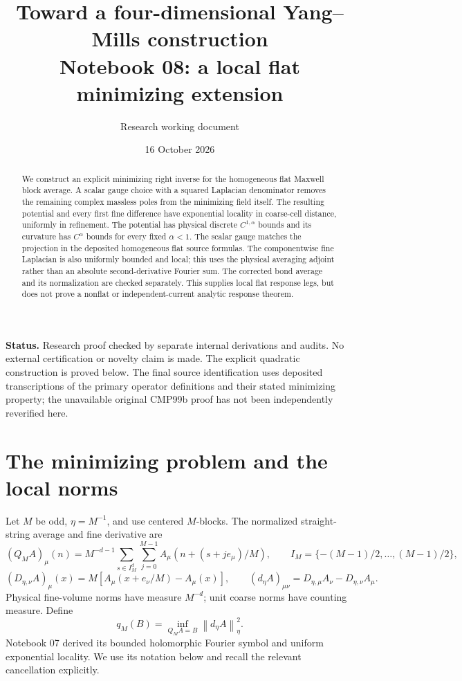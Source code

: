 \documentclass[11pt]{article}
\title{Toward a four-dimensional Yang--Mills construction\\
\large Notebook 08: a local flat minimizing extension}
\author{Research working document}
\date{16 October 2026}
\theoremstyle{remark}
\newcommand{\norm}[1]{\left\|#1\right\|}
\begin{document}
\maketitle

\begin{abstract}
We construct an explicit minimizing right inverse for the homogeneous
flat Maxwell block average. A scalar gauge choice with a squared
Laplacian denominator removes the remaining complex massless poles
from the minimizing field itself. The resulting potential and every
first fine difference have exponential locality in coarse-cell
distance, uniformly in refinement. The potential has physical
discrete $C^{1,\alpha}$ bounds and its curvature has $C^\alpha$
bounds for every fixed $\alpha<1$. The scalar gauge matches the
projection in the deposited homogeneous flat source formulas.
The componentwise fine Laplacian is also uniformly bounded and local;
this uses the physical averaging adjoint rather than an absolute
second-derivative Fourier sum. The
corrected bond average and its normalization are checked separately.
This supplies local flat response legs, but does not prove a
nonflat or independent-current analytic response theorem.
\end{abstract}

\noindent\textbf{Status.}
Research proof checked by separate internal derivations and audits.
No external certification or novelty claim is made.
The explicit quadratic construction is proved
below. The final source identification uses deposited transcriptions
of the primary operator definitions and their stated minimizing
property; the unavailable original CMP99b proof has not been
independently reverified here.

\section{The minimizing problem and the local norms}

Let $M$ be odd, $\eta=M^{-1}$, and use centered $M$-blocks.
The normalized straight-string average and fine derivative are
\[
 (Q_M A)_\mu(n)=M^{-d-1}\sum_{s\in I_M^d}
          \sum_{j=0}^{M-1}A_\mu(n+(s+je_\mu)/M),
 \qquad I_M=\{-(M-1)/2,\ldots,(M-1)/2\},
\]
\[
 (D_{\eta,\nu}A)_\mu(x)
   =M[A_\mu(x+e_\nu/M)-A_\mu(x)],\qquad
 (d_\eta A)_{\mu\nu}=D_{\eta,\mu}A_\nu-D_{\eta,\nu}A_\mu.
\]
Physical fine-volume norms have measure $M^{-d}$; unit coarse
norms have counting measure. Define
\[
 q_M(B)=\inf_{Q_M A=B}\norm{d_\eta A}_\eta^2.
\]
Notebook 07 derived its bounded holomorphic Fourier symbol and
uniform exponential locality. We use its notation below and recall
the relevant cancellation explicitly.
\end{document}
